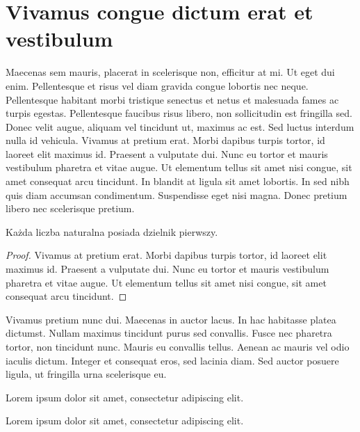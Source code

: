 \section{Vivamus congue dictum erat et vestibulum}
Maecenas sem mauris, placerat in scelerisque non, efficitur at mi. Ut eget dui enim. Pellentesque et risus vel diam gravida congue lobortis nec neque. Pellentesque habitant morbi tristique senectus et netus et malesuada fames ac turpis egestas. Pellentesque faucibus risus libero, non sollicitudin est fringilla sed. Donec velit augue, aliquam vel tincidunt ut, maximus ac est. Sed luctus interdum nulla id vehicula. Vivamus at pretium erat. Morbi dapibus turpis tortor, id laoreet elit maximus id. Praesent a vulputate dui. Nunc eu tortor et mauris vestibulum pharetra et vitae augue. Ut elementum tellus sit amet nisi congue, sit amet consequat arcu tincidunt. In blandit at ligula sit amet lobortis. In sed nibh quis diam accumsan condimentum. Suspendisse eget nisi magna. Donec pretium libero nec scelerisque pretium.
\begin{theorem}
    Każda liczba naturalna posiada dzielnik pierwszy.
\end{theorem}
\begin{proof}
    Vivamus at pretium erat. Morbi dapibus turpis tortor, id laoreet elit maximus id. Praesent a vulputate dui. Nunc eu tortor et mauris vestibulum pharetra et vitae augue. Ut elementum tellus sit amet nisi congue, sit amet consequat arcu tincidunt.
\end{proof}
\newpage
Vivamus pretium nunc dui. Maecenas in auctor lacus. In hac habitasse platea dictumst. Nullam maximus tincidunt purus sed convallis. Fusce nec pharetra tortor, non tincidunt nunc. Mauris eu convallis tellus. Aenean ac mauris vel odio iaculis dictum. Integer et consequat eros, sed lacinia diam. Sed auctor posuere ligula, ut fringilla urna scelerisque eu.
\begin{definition}
    Lorem ipsum dolor sit amet, consectetur adipiscing elit.
\end{definition}
\begin{remark}
    Lorem ipsum dolor sit amet, consectetur adipiscing elit.
\end{remark}

